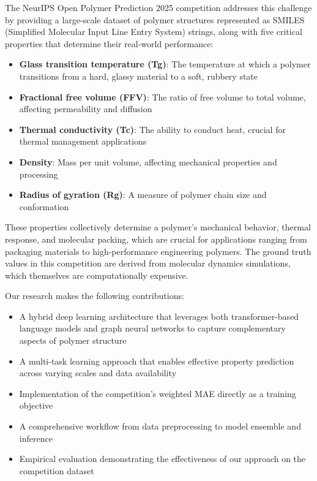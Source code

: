 \documentclass[10pt,twocolumn,letterpaper]{article}
\begin{document}
The NeurIPS Open Polymer Prediction 2025 competition addresses this challenge by providing a large-scale dataset of polymer structures represented as SMILES (Simplified Molecular Input Line Entry System) strings, along with five critical properties that determine their real-world performance:
\begin{itemize}
    \item \textbf{Glass transition temperature (Tg)}: The temperature at which a polymer transitions from a hard, glassy material to a soft, rubbery state
    \item \textbf{Fractional free volume (FFV)}: The ratio of free volume to total volume, affecting permeability and diffusion
    \item \textbf{Thermal conductivity (Tc)}: The ability to conduct heat, crucial for thermal management applications
    \item \textbf{Density}: Mass per unit volume, affecting mechanical properties and processing
    \item \textbf{Radius of gyration (Rg)}: A measure of polymer chain size and conformation
\end{itemize}

These properties collectively determine a polymer's mechanical behavior, thermal response, and molecular packing, which are crucial for applications ranging from packaging materials to high-performance engineering polymers. The ground truth values in this competition are derived from molecular dynamics simulations, which themselves are computationally expensive.

Our research makes the following contributions:
\begin{itemize}
    \item A hybrid deep learning architecture that leverages both transformer-based language models and graph neural networks to capture complementary aspects of polymer structure
    \item A multi-task learning approach that enables effective property prediction across varying scales and data availability
    \item Implementation of the competition's weighted MAE directly as a training objective
    \item A comprehensive workflow from data preprocessing to model ensemble and inference
    \item Empirical evaluation demonstrating the effectiveness of our approach on the competition dataset
\end{itemize}
\end{document}
